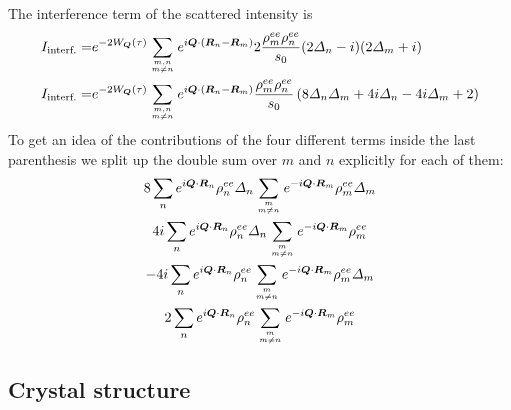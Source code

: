 The interference term of the scattered intensity is 
\begin{equation}
\begin{split} 
I_{\text{interf.}} =  & 
  \debyew
    \sumOff e^{ i \bv{Q} \cdot ( \bv{R}_{n} - \bv{R}_{m} ) }
    2 \frac{ \rho_{m}^{ee} \rho_{n}^{ee} }{ s_{0} }
     ( 2\Delta_{n} -i )( 2\Delta_{m} + i ) \\
 I_{\text{interf.}} =   & 
  \debyew
    \sumOff e^{ i \bv{Q} \cdot ( \bv{R}_{n} - \bv{R}_{m} ) }
    \frac{ \rho_{m}^{ee} \rho_{n}^{ee} }{ s_{0} } 
    \left( 8 \Delta_{n}\Delta_{m}  + 4i\Delta_{n} - 4i\Delta_{m} + 2 \right)
\end{split}
\end{equation}
To get an idea of the contributions of the four different terms inside the last
parenthesis we split up the double sum over $m$ and $n$ explicitly for each of
them:
\begin{gather} 
    8 
    \sum_{n} 
     e^{ i \bv{Q} \cdot \bv{R}_{n}  }
     \rho_{n}^{ee}  
     \Delta_{n}
    \sumOffm
     e^{- i \bv{Q} \cdot  \bv{R}_{m} }
     \rho_{m}^{ee} 
      \Delta_{m}  \\ 
    4i\sum_{n} 
     e^{ i \bv{Q} \cdot \bv{R}_{n}  }
     \rho_{n}^{ee}  
     \Delta_{n} 
    \sumOffm
     e^{- i \bv{Q} \cdot  \bv{R}_{m} }
     \rho_{m}^{ee} \label{eq:term2} \\
    -4i\sum_{n} 
     e^{ i \bv{Q} \cdot \bv{R}_{n}  }
     \rho_{n}^{ee}  
    \sumOffm
     e^{- i \bv{Q} \cdot  \bv{R}_{m} }
     \rho_{m}^{ee} 
     \Delta_{m}  \label{eq:term3}  \\
    2\sum_{n} 
     e^{ i \bv{Q} \cdot \bv{R}_{n}  }
     \rho_{n}^{ee}  
    \sumOffm
     e^{- i \bv{Q} \cdot  \bv{R}_{m} }
     \rho_{m}^{ee} \label{eq:term4}  
\end{gather}


\subsection{Crystal structure} 

